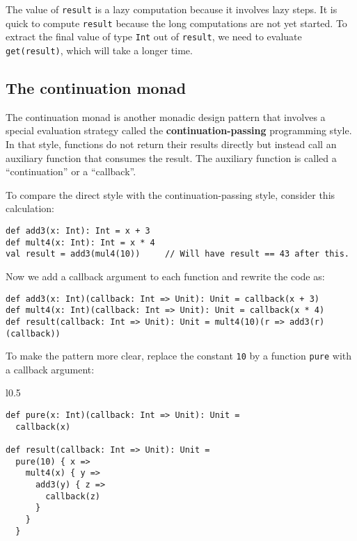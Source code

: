 \noindent The value of \lstinline!result! is a lazy computation because
it involves lazy steps. It is quick to compute \lstinline!result!
because the long computations are not yet started. To extract the
final value of type \lstinline!Int! out of \lstinline!result!, we
need to evaluate \lstinline!get(result)!, which will take a longer
time.

\subsection{The continuation monad\label{subsec:The-continuation-monad}}

The continuation monad is another monadic design pattern that involves
a special evaluation strategy called the \textbf{continuation-passing}
programming style. In that style,
functions do not return their results directly but instead call an
auxiliary function that consumes the result. The auxiliary function
is called a \textsf{``}continuation\textsf{''} or a \textsf{``}callback\textsf{''}.

To compare the direct style with the continuation-passing style, consider
this calculation:
\begin{lstlisting}
def add3(x: Int): Int = x + 3
def mult4(x: Int): Int = x * 4
val result = add3(mul4(10))     // Will have result == 43 after this.
\end{lstlisting}
Now we add a callback argument to each function and rewrite the code
as:
\begin{lstlisting}
def add3(x: Int)(callback: Int => Unit): Unit = callback(x + 3)
def mult4(x: Int)(callback: Int => Unit): Unit = callback(x * 4)
def result(callback: Int => Unit): Unit = mult4(10)(r => add3(r)(callback))
\end{lstlisting}
To make the pattern more clear, replace the constant \lstinline!10!
by a function \lstinline!pure! with a callback argument:

\begin{wrapfigure}{l}{0.5\columnwidth}%
\vspace{-0.8\baselineskip}
\begin{lstlisting}
def pure(x: Int)(callback: Int => Unit): Unit =
  callback(x)

def result(callback: Int => Unit): Unit =
  pure(10) { x =>
    mult4(x) { y =>
      add3(y) { z =>
        callback(z)
      }
    }
  }
\end{lstlisting}

\vspace{-1\baselineskip}
\end{wrapfigure}%

